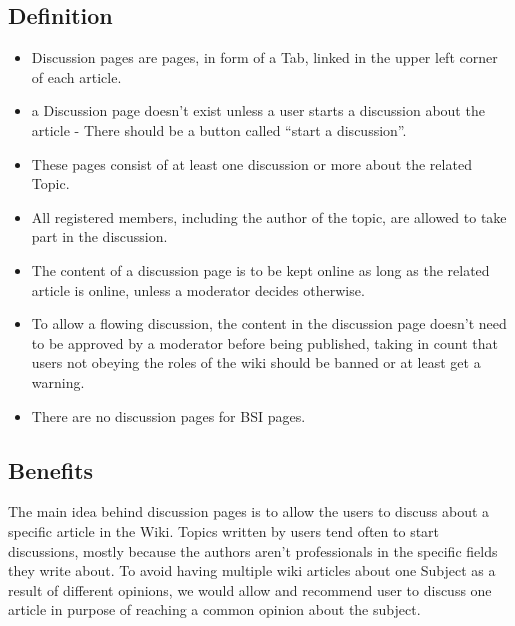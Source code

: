 \subsection{Definition}
\begin{itemize}
\item Discussion pages are pages, in form of a Tab, linked in the upper left corner of each article. 
\item a Discussion page doesn’t exist unless a user starts a discussion about the article - There should be a button called “start a discussion”.
\item These pages consist of at least one discussion or more about the related Topic. 
\item All registered members, including the author of the topic, are allowed to take part in the discussion.
\item The content of a discussion page is to be kept online as long as the related article is online, unless a moderator decides otherwise.
\item To allow a flowing discussion, the content in the discussion page doesn’t need to be approved by a moderator before being published, taking in count that users not obeying the roles of the wiki should be banned or at least get a warning.
\item There are no discussion pages for BSI pages.
 \end{itemize}

\subsection{Benefits}
The main idea behind discussion pages is to allow the users to discuss about a specific article in the Wiki.
Topics written by users tend often to start discussions, mostly because the authors aren’t professionals in the specific fields they write about. To avoid having multiple wiki articles about one Subject as a result of different opinions, we would allow and recommend user to discuss one article in purpose of reaching a common opinion about the subject.

